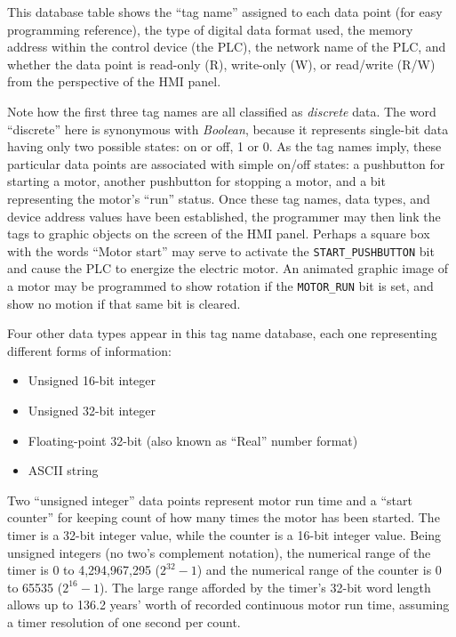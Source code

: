 This database table shows the ``tag name'' assigned to each data point (for easy programming reference), the type of digital data format used, the memory address within the control device (the PLC), the network name of the PLC, and whether the data point is read-only (R), write-only (W), or read/write (R/W) from the perspective of the HMI panel.

Note how the first three tag names are all classified as \textit{discrete} data.  The word ``discrete'' here is synonymous with \textit{Boolean}, because it represents single-bit data having only two possible states: on or off, 1 or 0.  As the tag names imply, these particular data points are associated with simple on/off states: a pushbutton for starting a motor, another pushbutton for stopping a motor, and a bit representing the motor's ``run'' status.  Once these tag names, data types, and device address values have been established, the programmer may then link the tags to graphic objects on the screen of the HMI panel.  Perhaps a square box with the words ``Motor start'' may serve to activate the \texttt{START\_PUSHBUTTON} bit and cause the PLC to energize the electric motor.  An animated graphic image of a motor may be programmed to show rotation if the \texttt{MOTOR\_RUN} bit is set, and show no motion if that same bit is cleared.

\filbreak

Four other data types appear in this tag name database, each one representing different forms of information:

\begin{itemize}
\item Unsigned 16-bit integer
\item Unsigned 32-bit integer
\item Floating-point 32-bit (also known as ``Real'' number format)
\item ASCII string
\end{itemize}

Two ``unsigned integer'' data points represent motor run time and a ``start counter'' for keeping count of how many times the motor has been started.  The timer is a 32-bit integer value, while the counter is a 16-bit integer value.  Being unsigned integers (no two's complement notation), the numerical range of the timer is 0 to 4,294,967,295 ($2^{32} - 1$) and the numerical range of the counter is 0 to 65535 ($2^{16} - 1$).  The large range afforded by the timer's 32-bit word length allows up to 136.2 years' worth of recorded continuous motor run time, assuming a timer resolution of one second per count.

